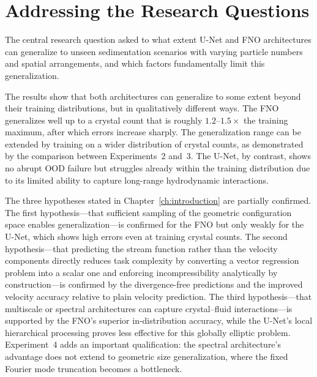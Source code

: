 \section{Addressing the Research Questions}

The central research question asked to what extent U-Net and FNO architectures can generalize to unseen sedimentation scenarios with varying particle numbers and spatial arrangements, and which factors fundamentally limit this generalization.

The results show that both architectures can generalize to some extent beyond their training distributions, but in qualitatively different ways. The FNO generalizes well up to a crystal count that is roughly $1.2$--$1.5\times$ the training maximum, after which errors increase sharply. The generalization range can be extended by training on a wider distribution of crystal counts, as demonstrated by the comparison between Experiments~2 and~3. The U-Net, by contrast, shows no abrupt OOD failure but struggles already within the training distribution due to its limited ability to capture long-range hydrodynamic interactions.

The three hypotheses stated in Chapter~\ref{ch:introduction} are partially confirmed. The first hypothesis—that sufficient sampling of the geometric configuration space enables generalization—is confirmed for the FNO but only weakly for the U-Net, which shows high errors even at training crystal counts. The second hypothesis—that predicting the stream function rather than the velocity components directly reduces task complexity by converting a vector regression problem into a scalar one and enforcing incompressibility analytically by construction—is confirmed by the divergence-free predictions and the improved velocity accuracy relative to plain velocity prediction. The third hypothesis—that multiscale or spectral architectures can capture crystal--fluid interactions—is supported by the FNO's superior in-distribution accuracy, while the U-Net's local hierarchical processing proves less effective for this globally elliptic problem. Experiment~4 adds an important qualification: the spectral architecture's advantage does not extend to geometric size generalization, where the fixed Fourier mode truncation becomes a bottleneck.

